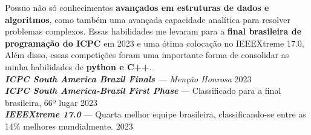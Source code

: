 \vspace*{3pt}
Possuo não só conhecimentos \textbf{avançados em estruturas de dados e algoritmos}, como também uma avançada capacidade
analítica para resolver problemas complexos. Essas habilidades me levaram para a \textbf{final brasileira de programação do
ICPC} em 2023 e uma ótima colocação no IEEEXtreme 17.0, Além disso, essas competições foram uma importante forma de
consolidar as minha habilidades de \textbf{python e C++}. \\

\vspace*{7pt}
\textit{\textbf{ICPC South America Brazil Finals} --- Menção Honrosa } \hfill 2023\\
\textit{\textbf{ICPC South America-Brazil First Phase}} --- Classificado para a final brasileira, 66º lugar \hfill 2023\\
\textit{\textbf{IEEEXtreme 17.0}} --- Quarta melhor equipe brasileira, classificando-se entre as 14\% melhores mundialmente. \hfill 2023\\
